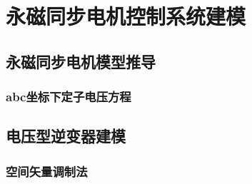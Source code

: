 
\chapter{永磁同步电机控制系统建模}\label{ch:install}

\section{永磁同步电机模型推导}
\subsection{abc坐标下定子电压方程}
\section{电压型逆变器建模}
\subsection{空间矢量调制法}



